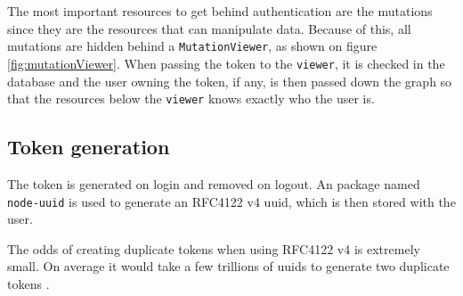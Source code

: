 The most important resources to get behind authentication are the mutations since they are the resources that can manipulate data. 
Because of this, all mutations are hidden behind a \verb+MutationViewer+, as shown on figure \ref{fig:mutationViewer}. 
When passing the token to the \verb+viewer+, it is checked in the database and the user owning the token, if any, is then passed down the graph so that the resources below the \verb+viewer+ knows exactly who the user is. 


\subsection{Token generation}
The token is generated on login and removed on logout. 
An  package named \verb+node-uuid+ is used to generate an RFC4122 v4 \gls{uuid}, which is then stored with the user. 

The odds of creating duplicate tokens when using RFC4122 v4 is extremely small. 
On average it would take a few trillions of \gls{uuid}s to generate two duplicate tokens \citep{authentication:uuid}.
